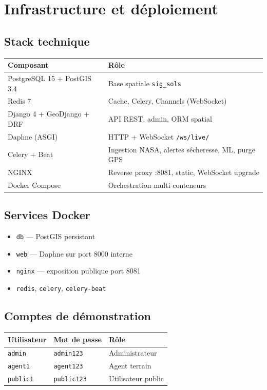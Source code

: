 \documentclass[11pt,a4paper]{report}
\begin{document}
\chapter{Infrastructure et déploiement}

\section{Stack technique}
\begin{tabularx}{\textwidth}{@{}lX@{}}
\toprule
\textbf{Composant} & \textbf{Rôle} \\
\midrule
PostgreSQL 15 + PostGIS 3.4 & Base spatiale \texttt{sig\_sols} \\
Redis 7 & Cache, Celery, Channels (WebSocket) \\
Django 4 + GeoDjango + DRF & API REST, admin, ORM spatial \\
Daphne (ASGI) & HTTP + WebSocket \texttt{/ws/live/} \\
Celery + Beat & Ingestion NASA, alertes sécheresse, ML, purge GPS \\
NGINX & Reverse proxy :8081, static, WebSocket upgrade \\
Docker Compose & Orchestration multi-conteneurs \\
\bottomrule
\end{tabularx}

\section{Services Docker}
\begin{itemize}[leftmargin=*]
  \item \texttt{db} — PostGIS persistant
  \item \texttt{web} — Daphne sur port 8000 interne
  \item \texttt{nginx} — exposition publique port 8081
  \item \texttt{redis}, \texttt{celery}, \texttt{celery-beat}
\end{itemize}

\section{Comptes de démonstration}
\begin{tabular}{lll}
\toprule
Utilisateur & Mot de passe & Rôle \\
\midrule
\texttt{admin} & \texttt{admin123} & Administrateur \\
\texttt{agent1} & \texttt{agent123} & Agent terrain \\
\texttt{public1} & \texttt{public123} & Utilisateur public \\
\bottomrule
\end{tabular}
\end{document}
